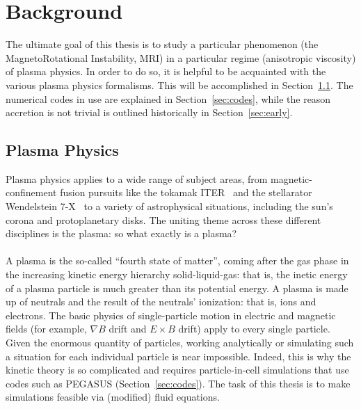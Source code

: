 \chapter{Background}\label{chap:background}
The ultimate goal of this thesis is to study a particular phenomenon (the MagnetoRotational Instability, MRI) in a particular regime (anisotropic viscosity) of plasma physics. In order to do so, it is helpful to be acquainted with the various plasma physics formalisms. This will be accomplished in Section~\ref{sec:plasmaphysics}. The numerical codes in use are explained in Section~\ref{sec:codes}, while the reason accretion is not trivial is outlined historically in Section~\ref{sec:early}.



\section{Plasma Physics} \label{sec:plasmaphysics}
Plasma physics applies to a wide range of subject areas, from magnetic-confinement fusion pursuits like the tokamak ITER~\cite{Janeschitz2001} and the stellarator Wendelstein 7-X~\cite{Grieger1993} to a variety of astrophysical situations, including the sun's corona and protoplanetary disks. The uniting theme across these different disciplines is the plasma: so what exactly is a plasma? \\
\\
A plasma is the so-called ``fourth state of matter'', coming after the gas phase in the increasing kinetic energy hierarchy solid-liquid-gas: that is, the inetic energy of a plasma particle is much greater than its potential energy. A plasma is made up of neutrals and the result of the neutrals' ionization: that is, ions and electrons. The basic physics of single-particle motion in electric and magnetic fields (for example, $\nabla B$ drift and $E\times B$ drift) apply to every single particle. Given the enormous quantity of particles, working analytically or simulating such a situation for each individual particle is near impossible. Indeed, this is why the kinetic theory is so complicated and requires particle-in-cell simulations that use codes such as PEGASUS (Section~\ref{sec:codes}). The task of this thesis is to make simulations feasible via (modified) fluid equations. 

